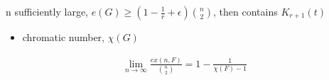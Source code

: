 \begin{thm}
    n sufficiently large, $e(G) \geq (1 - \frac{1}{r} + \epsilon) {n\choose2}$, then contains $K_{r+1}(t)$
\end{thm}

\begin{itemize}
    \item chromatic number, $\chi(G)$
\end{itemize}

\begin{cor}
    \begin{align*}
        \lim_{n \rightarrow \infty} \frac{ex(n, F)}{{n\choose 2}} = 1 -  \frac{1}{\chi(F) - 1}
    \end{align*}
\end{cor}
